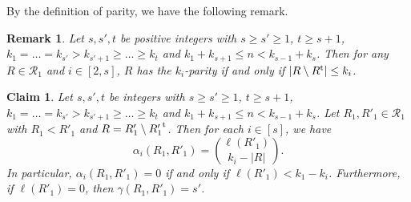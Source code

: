 \documentclass[a4paper,11pt]{article}
\newtheorem{remark}[theorem]{Remark}
\newtheorem{claim}[theorem]{Claim}
\begin{document}
By the definition of parity,  we have the following remark.
\begin{remark}\label{NEW12}
Let $s, s', t$ be positive integers with $s\geq s'\geq 1$, $t\geq s+1$, $k_1=\dots=k_{s'}> k_{s'+1}\geq\dots\geq k_t$ and $k_1+k_{s+1}\leq n <k_{s-1}+k_s$. Then
for any $R\in \mathcal{R}_1$ and $i\in [2, s]$, $R$ has the $k_i$-parity if and only if $|R\setminus R^{\rm t}|\leq k_i$.
\end{remark}


\begin{claim}\label{claim1}
Let $s, s', t$ be integers with $s\geq s'\geq 1$, $t\geq s+1$, $k_1=\dots=k_{s'}> k_{s'+1}\geq\dots\geq k_t$ and $k_1+k_{s+1}\leq n <k_{s-1}+k_s$.
Let  $R_1, R'_1\in \mathcal{R}_1$ with $R_1<R'_1$ and $R=R'_1\setminus {R'_1}^{\rm t}$.
Then for each $i\in [s]$, we have
\[
\alpha_i(R_1, R'_1)={\ell(R'_1)\choose k_i-|R|}.
\]
In particular, $\alpha_i(R_1, R'_1)=0$ if and only if $\ell(R'_1)< k_1-k_i$. Furthermore, if $\ell(R'_1)=0$, then $\gamma(R_1, R'_1)=s'$.
\end{claim}
\end{document}
